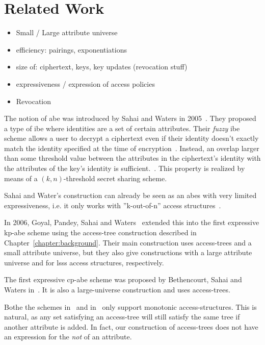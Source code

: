 \chapter{Related Work}

\begin{itemize}
    \item Small / Large attribute universe
    \item efficiency: pairings, exponentiations
    \item size of: ciphertext, keys, key updates (revocation stuff)
    \item expressiveness / expression of access policies
    \item Revocation
\end{itemize}

The notion of \acrlong{abe} was introduced by Sahai and Waters in 2005~\cite{sahai_fuzzy_2005}.
They proposed a type of \gls{ibe} where identities are a set of certain attributes.
Their \emph{fuzzy} \gls{ibe} scheme allows a user to decrypt a ciphertext even if their identity doesn't exactly match the identity specified at the time of encryption~\cite{sahai_fuzzy_2005}.
Instead, an overlap larger than some threshold value between the attributes in the ciphertext's identity with the attributes of the key's identity is sufficient.~\cite{sahai_fuzzy_2005}.
This property is realized by means of a $(k, n)$-threshold secret sharing scheme.

Sahai and Water's construction can already be seen as an \acrshort{abes} with very limited expressiveness, i.e. it only works with ''k-out-of-n'' access structures~\cite{goyal_attribute-based_2006}.

In 2006, Goyal, Pandey, Sahai and Waters~\cite{goyal_attribute-based_2006} extended this into the first expressive \acrshort{kp-abe} scheme using the \gls{access-tree} construction described in Chapter~\ref{chapter:background}.
Their main construction uses \glspl{access-tree} and a small attribute universe, but they also give constructions with a large attribute universe and for \gls{lsss} access structures, respectively.

The first expressive \acrshort{cp-abe} scheme was proposed by Bethencourt, Sahai and Waters in~\cite{bethencourt_ciphertext-policy_2007}.
It is also a large-universe construction and uses \glspl{access-tree}.

Bothe the schemes in~\cite{goyal_attribute-based_2006} and in~\cite{bethencourt_ciphertext-policy_2007} only support monotonic \glspl{access-structure}.
This is natural, as any set satisfying an \gls{access-tree} will still satisfy the same tree if another attribute is added.
In fact, our construction of \glspl{access-tree} does not have an expression for the \emph{not} of an attribute.


